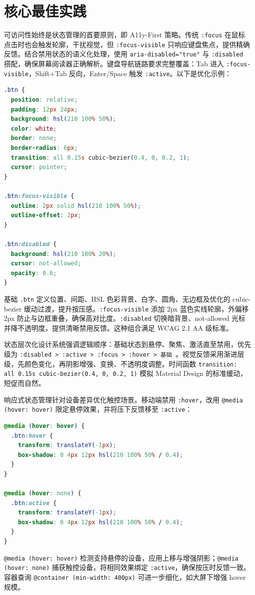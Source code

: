 \chapter{核心最佳实践}
可访问性始终是状态管理的首要原则，即 A11y-First 策略。传统 \texttt{:focus} 在鼠标点击时也会触发轮廓，干扰视觉，但 \texttt{:focus-visible} 只响应键盘焦点，提供精确反馈。结合禁用状态的语义化处理，使用 \texttt{aria-disabled="true"} 与 \texttt{:disabled} 搭配，确保屏幕阅读器正确解析。键盘导航链路要求完整覆盖：Tab 进入 \texttt{:focus-visible}，Shift+Tab 反向，Enter/Space 触发 \texttt{:active}。以下是优化示例：\par
\begin{lstlisting}[language=css]
.btn {
  position: relative;
  padding: 12px 24px;
  background: hsl(210 100% 50%);
  color: white;
  border: none;
  border-radius: 6px;
  transition: all 0.15s cubic-bezier(0.4, 0, 0.2, 1);
  cursor: pointer;
}

.btn:focus-visible {
  outline: 2px solid hsl(210 100% 50%);
  outline-offset: 2px;
}

.btn:disabled {
  background: hsl(210 100% 20%);
  cursor: not-allowed;
  opacity: 0.6;
}
\end{lstlisting}
基础 \texttt{.btn} 定义位置、间距、HSL 色彩背景、白字、圆角、无边框及优化的 cubic-bezier 缓动过渡，提升按压感。\texttt{:focus-visible} 添加 2px 蓝色实线轮廓，外偏移 2px 防止与边框重叠，确保高对比度。\texttt{:disabled} 切换暗背景、not-allowed 光标并降不透明度，提供清晰禁用反馈。这种组合满足 WCAG 2.1 AA 级标准。\par
状态层次化设计系统强调逻辑顺序：基础状态到悬停、聚焦、激活直至禁用，优先级为 \texttt{:disabled > :active > :focus > :hover > 基础 }。视觉反馈采用渐进层级，先颜色变化，再阴影增强、变换、不透明度调整。时间函数 \texttt{transition: all 0.15s cubic-bezier(0.4, 0, 0.2, 1)} 模拟 Material Design 的标准缓动，短促而自然。\par
响应式状态管理针对设备差异优化触控场景。移动端禁用 \texttt{:hover}，改用 \texttt{@media (hover: hover)} 限定悬停效果，并将压下反馈移至 \texttt{:active}：\par
\begin{lstlisting}[language=css]
@media (hover: hover) {
  .btn:hover {
    transform: translateY(-1px);
    box-shadow: 0 4px 12px hsl(210 100% 50% / 0.4);
  }
}

@media (hover: none) {
  .btn:active {
    transform: translateY(-1px);
    box-shadow: 0 4px 12px hsl(210 100% 50% / 0.4);
  }
}
\end{lstlisting}
\texttt{@media (hover: hover)} 检测支持悬停的设备，应用上移与增强阴影；\texttt{@media (hover: none)} 捕获触控设备，将相同效果绑定 \texttt{:active}，确保按压时反馈一致。容器查询 \texttt{@container (min-width: 400px)} 可进一步细化，如大屏下增强 hover 规模。\par

